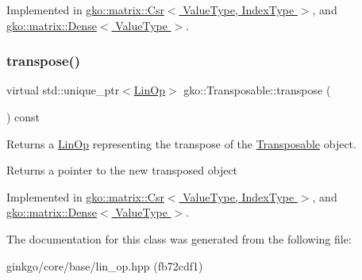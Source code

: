 Implemented in \hyperlink{classgko_1_1matrix_1_1Csr_a38820451af5424f18b767667f3067d72}{gko\+::matrix\+::\+Csr$<$ Value\+Type, Index\+Type $>$}, and \hyperlink{classgko_1_1matrix_1_1Dense_a19890b1448497a50d57c16ed4c3bd820}{gko\+::matrix\+::\+Dense$<$ Value\+Type $>$}.

\mbox{\label{classgko_1_1Transposable_a5c6b778b71b47d53e0bda6ccf894d318}} 
\subsubsection{\texorpdfstring{transpose()}{transpose()}}
{\footnotesize\ttfamily virtual std\+::unique\+\_\+ptr$<$\hyperlink{classgko_1_1LinOp}{Lin\+Op}$>$ gko\+::\+Transposable\+::transpose (\begin{DoxyParamCaption}{ }\end{DoxyParamCaption}) const\hspace{0.3cm}{\ttfamily [pure virtual]}}



Returns a \hyperlink{classgko_1_1LinOp}{Lin\+Op} representing the transpose of the \hyperlink{classgko_1_1Transposable}{Transposable} object. 

\begin{DoxyReturn}{Returns}
a pointer to the new transposed object 
\end{DoxyReturn}


Implemented in \hyperlink{classgko_1_1matrix_1_1Csr_ab79e609214d6b4834d5961ee0a7d3519}{gko\+::matrix\+::\+Csr$<$ Value\+Type, Index\+Type $>$}, and \hyperlink{classgko_1_1matrix_1_1Dense_a64ea8e876f5390a535a2ef486bd5ab9a}{gko\+::matrix\+::\+Dense$<$ Value\+Type $>$}.



The documentation for this class was generated from the following file\+:\begin{DoxyCompactItemize}
\item 
ginkgo/core/base/lin\+\_\+op.\+hpp (fb72cdf1)\end{DoxyCompactItemize}
